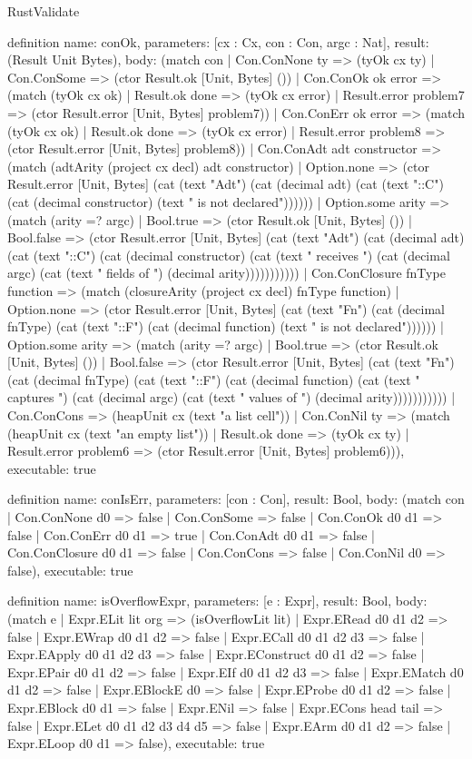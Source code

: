 \begin{lexlean}{RustValidate}
\begin{semanticmodule}
definition{
  name: conOk,
  parameters: [cx : Cx, con : Con, argc : Nat],
  result: (Result Unit Bytes),
  body: (match con
    | Con.ConNone ty => (tyOk cx ty)
    | Con.ConSome => (ctor Result.ok [Unit, Bytes] ())
    | Con.ConOk ok error => (match (tyOk cx ok)
      | Result.ok done => (tyOk cx error)
      | Result.error problem7 => (ctor Result.error [Unit, Bytes] problem7))
    | Con.ConErr ok error => (match (tyOk cx ok)
      | Result.ok done => (tyOk cx error)
      | Result.error problem8 => (ctor Result.error [Unit, Bytes] problem8))
    | Con.ConAdt adt constructor => (match (adtArity (project cx decl) adt constructor)
      | Option.none => (ctor Result.error [Unit, Bytes] (cat (text "Adt") (cat (decimal adt) (cat (text "::C") (cat (decimal constructor) (text " is not declared"))))))
      | Option.some arity => (match (arity =? argc)
        | Bool.true => (ctor Result.ok [Unit, Bytes] ())
        | Bool.false => (ctor Result.error [Unit, Bytes] (cat (text "Adt") (cat (decimal adt) (cat (text "::C") (cat (decimal constructor) (cat (text " receives ") (cat (decimal argc) (cat (text " fields of ") (decimal arity)))))))))))
    | Con.ConClosure fnType function => (match (closureArity (project cx decl) fnType function)
      | Option.none => (ctor Result.error [Unit, Bytes] (cat (text "Fn") (cat (decimal fnType) (cat (text "::F") (cat (decimal function) (text " is not declared"))))))
      | Option.some arity => (match (arity =? argc)
        | Bool.true => (ctor Result.ok [Unit, Bytes] ())
        | Bool.false => (ctor Result.error [Unit, Bytes] (cat (text "Fn") (cat (decimal fnType) (cat (text "::F") (cat (decimal function) (cat (text " captures ") (cat (decimal argc) (cat (text " values of ") (decimal arity)))))))))))
    | Con.ConCons => (heapUnit cx (text "a list cell"))
    | Con.ConNil ty => (match (heapUnit cx (text "an empty list"))
      | Result.ok done => (tyOk cx ty)
      | Result.error problem6 => (ctor Result.error [Unit, Bytes] problem6))),
  executable: true
}

definition{
  name: conIsErr,
  parameters: [con : Con],
  result: Bool,
  body: (match con
    | Con.ConNone d0 => false
    | Con.ConSome => false
    | Con.ConOk d0 d1 => false
    | Con.ConErr d0 d1 => true
    | Con.ConAdt d0 d1 => false
    | Con.ConClosure d0 d1 => false
    | Con.ConCons => false
    | Con.ConNil d0 => false),
  executable: true
}

definition{
  name: isOverflowExpr,
  parameters: [e : Expr],
  result: Bool,
  body: (match e
    | Expr.ELit lit org => (isOverflowLit lit)
    | Expr.ERead d0 d1 d2 => false
    | Expr.EWrap d0 d1 d2 => false
    | Expr.ECall d0 d1 d2 d3 => false
    | Expr.EApply d0 d1 d2 d3 => false
    | Expr.EConstruct d0 d1 d2 => false
    | Expr.EPair d0 d1 d2 => false
    | Expr.EIf d0 d1 d2 d3 => false
    | Expr.EMatch d0 d1 d2 => false
    | Expr.EBlockE d0 => false
    | Expr.EProbe d0 d1 d2 => false
    | Expr.EBlock d0 d1 => false
    | Expr.ENil => false
    | Expr.ECons head tail => false
    | Expr.ELet d0 d1 d2 d3 d4 d5 => false
    | Expr.EArm d0 d1 d2 => false
    | Expr.ELoop d0 d1 => false),
  executable: true
}


\end{semanticmodule}
\end{lexlean}
